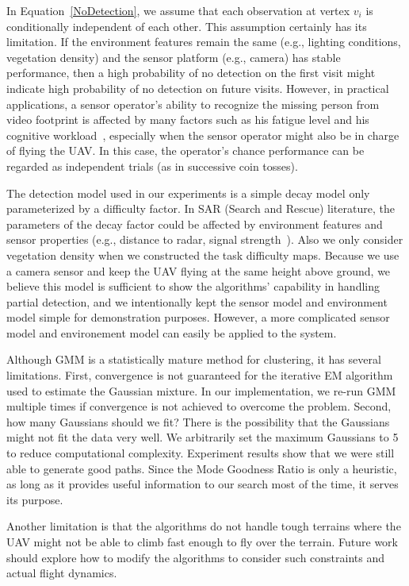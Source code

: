 \documentclass[journal]{IEEEtran}
\begin{document}
In Equation~\ref{NoDetection}, we assume that each observation at vertex $v_i$ is conditionally independent of each other. This assumption certainly has its limitation. If the environment features remain the same (e.g., lighting conditions, vegetation density) and the sensor platform (e.g., camera) has stable performance, then a high probability of no detection on the first visit might indicate high probability of no detection on future visits. However, in practical applications, a sensor operator's ability to recognize the missing person from video footprint is affected by many factors such as his fatigue level and his cognitive workload~\cite{Goodrich2008FieldReport}, especially when the sensor operator might also be in charge of flying the UAV. In this case, the operator's chance performance can be regarded as independent trials (as in successive coin tosses).

The detection model used in our experiments is a simple decay model only parameterized by a difficulty factor. In SAR (Search and Rescue) literature, the parameters of the decay factor could be affected by environment features and sensor properties (e.g., distance to radar, signal strength~\cite{Bourgault2006}). Also we only consider vegetation density when we constructed the task difficulty maps. Because we use a camera sensor and keep the UAV flying at the same height above ground, we believe this model is sufficient to show the algorithms' capability in handling partial detection, and we intentionally kept the sensor model and environment model simple for demonstration purposes. However, a more complicated sensor model and environement model can easily be applied to the system. 

Although GMM is a statistically mature method for clustering, it has several limitations. First, convergence is not guaranteed for the iterative EM algorithm used to estimate the Gaussian mixture. In our implementation, we re-run GMM multiple times if convergence is not achieved to overcome the problem. Second, how many Gaussians should we fit? There is the possibility that the Gaussians might not fit the data very well. We arbitrarily set the maximum Gaussians to 5 to reduce computational complexity. Experiment results show that we were still able to generate good paths. Since the Mode Goodness Ratio is only a heuristic, as long as it provides useful information to our search most of the time, it serves its purpose.

Another limitation is that the algorithms do not handle tough terrains where the UAV might not be able to climb fast enough to fly over the terrain. Future work should explore how to modify the algorithms to consider such constraints and actual flight dynamics.
\end{document}

